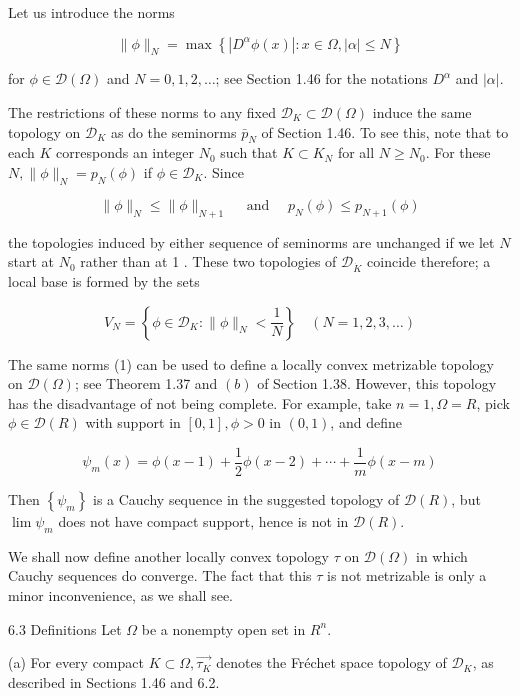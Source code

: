 \documentclass[10pt]{article}
\begin{document}
Let us introduce the norms

$$
\|\phi\|_{N}=\max \left\{\left|D^{\alpha} \phi(x)\right|: x \in \Omega,|\alpha| \leq N\right\}
$$

for $\phi \in \mathscr{D}(\Omega)$ and $N=0,1,2, \ldots$; see Section 1.46 for the notations $D^{\alpha}$ and $|\alpha|$.

The restrictions of these norms to any fixed $\mathscr{D}_{K} \subset \mathscr{D}(\Omega)$ induce the same topology on $\mathscr{D}_{K}$ as do the seminorms $\bar{p}_{N}$ of Section 1.46. To see this, note that to each $K$ corresponds an integer $N_{0}$ such that $K \subset K_{N}$ for all $N \geq N_{0}$. For these $N,\|\phi\|_{N}=p_{N}(\phi)$ if $\phi \in \mathscr{D}_{K}$. Since

$$
\|\phi\|_{N} \leq\|\phi\|_{N+1} \quad \text { and } \quad p_{N}(\phi) \leq p_{N+1}(\phi)
$$

the topologies induced by either sequence of seminorms are unchanged if we let $N$ start at $N_{0}$ rather than at 1 . These two topologies of $\mathscr{D}_{\dot{K}}$ coincide therefore; a local base is formed by the sets

$$
V_{N}=\left\{\phi \in \mathscr{D}_{K}:\|\phi\|_{N}<\frac{1}{N}\right\} \quad(N=1,2,3, \ldots)
$$

The same norms (1) can be used to define a locally convex metrizable topology on $\mathscr{D}(\Omega)$; see Theorem 1.37 and $(b)$ of Section 1.38. However, this topology has the disadvantage of not being complete. For example, take $n=1, \Omega=R$, pick $\phi \in \mathscr{D}(R)$ with support in $[0,1], \phi>0$ in $(0,1)$, and define

$$
\psi_{m}(x)=\phi(x-1)+\frac{1}{2} \phi(x-2)+\cdots+\frac{1}{m} \phi(x-m)
$$

Then $\left\{\psi_{m}\right\}$ is a Cauchy sequence in the suggested topology of $\mathscr{D}(R)$, but $\lim \psi_{m}$ does not have compact support, hence is not in $\mathscr{D}(R)$.

We shall now define another locally convex topology $\tau$ on $\mathscr{D}(\Omega)$ in which Cauchy sequences do converge. The fact that this $\tau$ is not metrizable is only a minor inconvenience, as we shall see.

6.3 Definitions Let $\Omega$ be a nonempty open set in $R^{n}$.

(a) For every compact $K \subset \Omega, \overrightarrow{\tau_{K}}$ denotes the Fréchet space topology of $\mathscr{D}_{K}$, as described in Sections 1.46 and 6.2.
\end{document}
